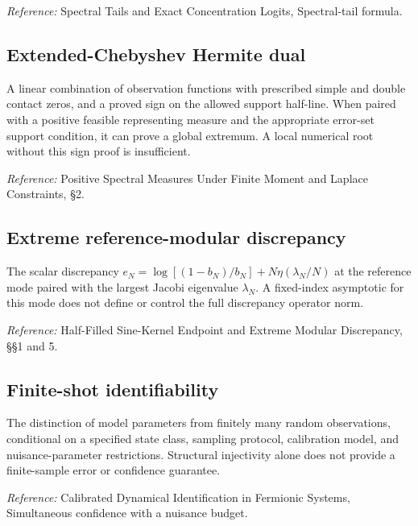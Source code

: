 \documentclass[
  10pt,
  a4paper,
]{article}
\begin{document}
\emph{Reference:} Spectral Tails and Exact Concentration Logits, Spectral-tail formula.

\subsection{Extended-Chebyshev Hermite dual}\label{extended-chebyshev-hermite-dual}

A linear combination of observation functions with prescribed simple and double contact zeros, and a proved sign on the allowed support half-line. When paired with a positive feasible representing measure and the appropriate error-set support condition, it can prove a global extremum. A local numerical root without this sign proof is insufficient.

\nopagebreak[4]

\emph{Reference:} Positive Spectral Measures Under Finite Moment and Laplace Constraints, §2.

\subsection{Extreme reference-modular discrepancy}\label{extreme-reference-modular-discrepancy}

The scalar discrepancy \(e_N=\log[(1-b_N)/b_N]+N\eta(\lambda_N/N)\) at the reference mode paired with the largest Jacobi eigenvalue \(\lambda_N\). A fixed-index asymptotic for this mode does not define or control the full discrepancy operator norm.

\nopagebreak[4]

\emph{Reference:} Half-Filled Sine-Kernel Endpoint and Extreme Modular Discrepancy, §§1 and 5.

\subsection{Finite-shot identifiability}\label{finite-shot-identifiability}

The distinction of model parameters from finitely many random observations, conditional on a specified state class, sampling protocol, calibration model, and nuisance-parameter restrictions. Structural injectivity alone does not provide a finite-sample error or confidence guarantee.

\nopagebreak[4]

\emph{Reference:} Calibrated Dynamical Identification in Fermionic Systems, Simultaneous confidence with a nuisance budget.
\end{document}
